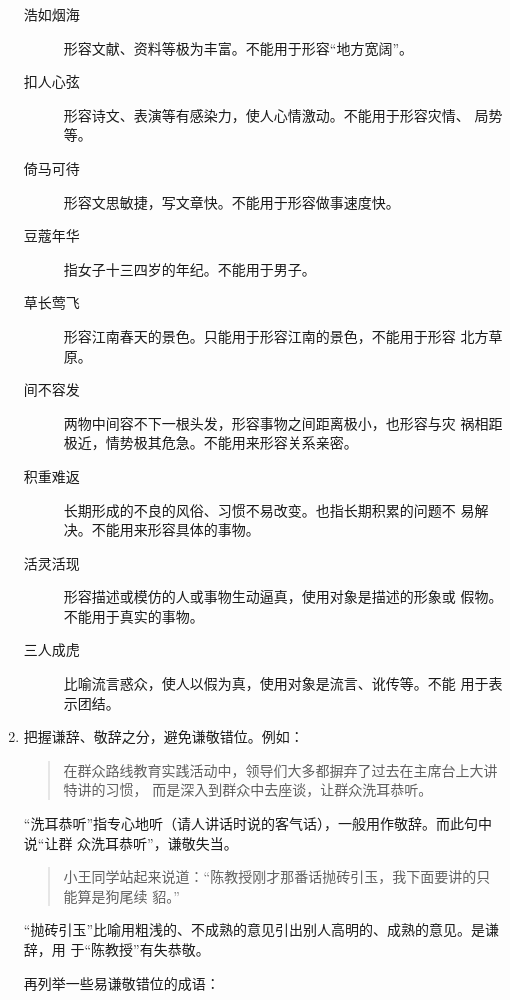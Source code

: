 \documentclass[final,oneside]{ctexbook}
\newenvironment{equotation}{\begin{quotation}\kaishu}{\end{quotation}}
\begin{document}
\begin{enumerate}
\begin{description}
      \item[浩如烟海] 形容文献、资料等极为丰富。不能用于形容“地方宽阔”。

      \item[扣人心弦] 形容诗文、表演等有感染力，使人心情激动。不能用于形容灾情、
        局势等。

      \item[倚马可待] 形容文思敏捷，写文章快。不能用于形容做事速度快。

      \item[豆蔻年华] 指女子十三四岁的年纪。不能用于男子。

      \item[草长莺飞] 形容江南春天的景色。只能用于形容江南的景色，不能用于形容
        北方草原。

      \item[间不容发] 两物中间容不下一根头发，形容事物之间距离极小，也形容与灾
        祸相距极近，情势极其危急。不能用来形容关系亲密。

      \item[积重难返] 长期形成的不良的风俗、习惯不易改变。也指长期积累的问题不
        易解决。不能用来形容具体的事物。

      \item[活灵活现] 形容描述或模仿的人或事物生动逼真，使用对象是描述的形象或
        假物。不能用于真实的事物。

      \item[三人成虎] 比喻流言惑众，使人以假为真，使用对象是流言、讹传等。不能
        用于表示团结。

    \end{description}

  \item 把握谦辞、敬辞之分，避免谦敬错位。例如：
    \begin{equotation}
      在群众路线教育实践活动中，领导们大多都摒弃了过去在主席台上大讲特讲的习惯，
      而是深入到群众中去座谈，让群众洗耳恭听。
    \end{equotation}
    “洗耳恭听”指专心地听（请人讲话时说的客气话），一般用作敬辞。而此句中说“让群
    众洗耳恭听”，谦敬失当。
    \begin{equotation}
      小王同学站起来说道：“陈教授刚才那番话抛砖引玉，我下面要讲的只能算是狗尾续
      貂。”
    \end{equotation}
    “抛砖引玉”比喻用粗浅的、不成熟的意见引出别人高明的、成熟的意见。是谦辞，用
    于“陈教授”有失恭敬。

    再列举一些易谦敬错位的成语：

    \begin{description}


\end{description}
\end{enumerate}
\end{document}
